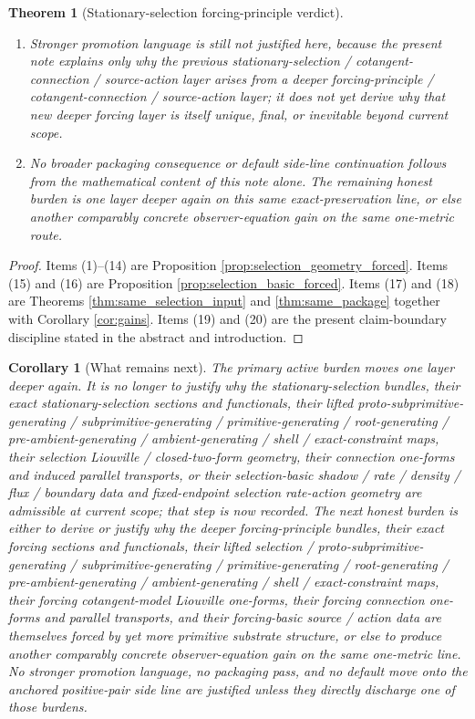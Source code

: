 \documentclass[11pt]{article}
\newtheorem{corollary}{Corollary}
\newtheorem{theorem}{Theorem}
\begin{document}
\begin{theorem}[Stationary-selection forcing-principle verdict]
\begin{enumerate}
    \item Stronger promotion language is still not justified here, because the present note explains only why the previous stationary-selection / cotangent-connection / source-action layer arises from a deeper forcing-principle / cotangent-connection / source-action layer; it does not yet derive why that new deeper forcing layer is itself unique, final, or inevitable beyond current scope.
    \item No broader packaging consequence or default side-line continuation follows from the mathematical content of this note alone. The remaining honest burden is one layer deeper again on this same exact-preservation line, or else another comparably concrete observer-equation gain on the same one-metric route.
\end{enumerate}
\end{theorem}

\begin{proof}
Items (1)--(14) are Proposition \ref{prop:selection_geometry_forced}. Items (15) and (16) are Proposition \ref{prop:selection_basic_forced}. Items (17) and (18) are Theorems \ref{thm:same_selection_input} and \ref{thm:same_package} together with Corollary \ref{cor:gains}. Items (19) and (20) are the present claim-boundary discipline stated in the abstract and introduction.
\end{proof}

\begin{corollary}[What remains next]
\label{cor:what_next}
The primary active burden moves one layer deeper again. It is no longer to justify why the stationary-selection bundles, their exact stationary-selection sections and functionals, their lifted proto-subprimitive-generating / subprimitive-generating / primitive-generating / root-generating / pre-ambient-generating / ambient-generating / shell / exact-constraint maps, their selection Liouville / closed-two-form geometry, their connection one-forms and induced parallel transports, or their selection-basic shadow / rate / density / flux / boundary data and fixed-endpoint selection rate-action geometry are admissible at current scope; that step is now recorded. The next honest burden is either to derive or justify why the deeper forcing-principle bundles, their exact forcing sections and functionals, their lifted selection / proto-subprimitive-generating / subprimitive-generating / primitive-generating / root-generating / pre-ambient-generating / ambient-generating / shell / exact-constraint maps, their forcing cotangent-model Liouville one-forms, their forcing connection one-forms and parallel transports, and their forcing-basic source / action data are themselves forced by yet more primitive substrate structure, or else to produce another comparably concrete observer-equation gain on the same one-metric line. No stronger promotion language, no packaging pass, and no default move onto the anchored positive-pair side line are justified unless they directly discharge one of those burdens.
\end{corollary}
\end{document}
